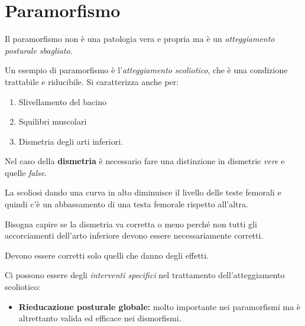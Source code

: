 
\section{Paramorfismo}


Il paramorfismo non è una patologia vera e propria ma è un
\emph{atteggiamento posturale sbagliato}.

Un esempio di paramorfismo è l'\emph{atteggiamento scoliotico}, che è
una condizione trattabile e riducibile. Si caratterizza anche per:

\begin{enumerate}
\def\labelenumi{\arabic{enumi}.}
\item
  Slivellamento del bacino
\item
  Squilibri muscolari
\item
  Dismetria degli arti inferiori.
\end{enumerate}

Nel caso della \textbf{dismetria} è necessario fare una distinzione in
dismetrie \emph{vere} e quelle \emph{false}.

La scoliosi dando una curva in alto diminuisce il livello delle teste
femorali e quindi c'è un abbassamento di una testa femorale rispetto
all'altra.

Bisogna capire se la dismetria va corretta o meno perché non tutti gli
accorciamenti dell'arto inferiore devono essere necessariamente
corretti.

Devono essere corretti solo quelli che danno degli effetti.

Ci possono essere degli \emph{interventi specifici} nel trattamento
dell'atteggiamento scoliotico:

\begin{itemize}
\item
  \textbf{Rieducazione posturale globale:} molto importante nei
  paramorfismi ma è altrettanto valida ed efficace nei dismorfismi.
\end{itemize}

